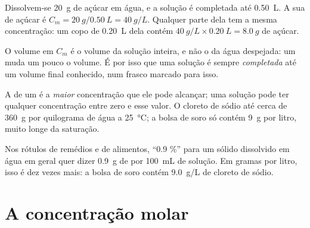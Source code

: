 \begin{example}\label{ex:g10:concentration-and-dilution:sugar}
Dissolvem-se \qty{20}{g} de açúcar em água, e a solução é completada até
\qty{0.50}{L}. A sua  de açúcar é
$C_m = \qty{20}{g} / \qty{0.50}{L} = \qty{40}{g/L}$. Qualquer parte dela
tem a mesma concentração: um copo de \qty{0.20}{L} dela contém
$\qty{40}{g/L} \times \qty{0.20}{L} = \qty{8.0}{g}$ de açúcar.
\end{example}


\begin{remark}\label{rem:g10:concentration-and-dilution:volume}
O volume em $C_m$ é o volume da solução inteira, e não o da água
despejada:  um  muda um pouco o volume. É por isso que
uma solução é sempre \emph{completada} até um volume final conhecido,
num frasco marcado para isso.
\end{remark}

\begin{remark}\label{rem:g10:concentration-and-dilution:not-solubility}
A  de um  é a \emph{maior} concentração que ele pode
alcançar; uma solução pode ter qualquer concentração entre zero e esse
valor. O cloreto de sódio  até cerca de \qty{360}{g} por
quilograma de água a \qty{25}{\celsius}; a bolsa de soro só contém
\qty{9}{g} por litro, muito longe da saturação.
\end{remark}

\begin{remark}\label{rem:g10:concentration-and-dilution:percent}
Nos rótulos de remédios e de alimentos, ``0.9 \%'' para um sólido
dissolvido em água em geral quer dizer \qty{0.9}{g} de  por
\qty{100}{mL} de solução. Em gramas por litro, isso é dez vezes mais: a
bolsa de soro contém \qty{9.0}{g/L} de cloreto de sódio.
\end{remark}

\section{A concentração molar}

